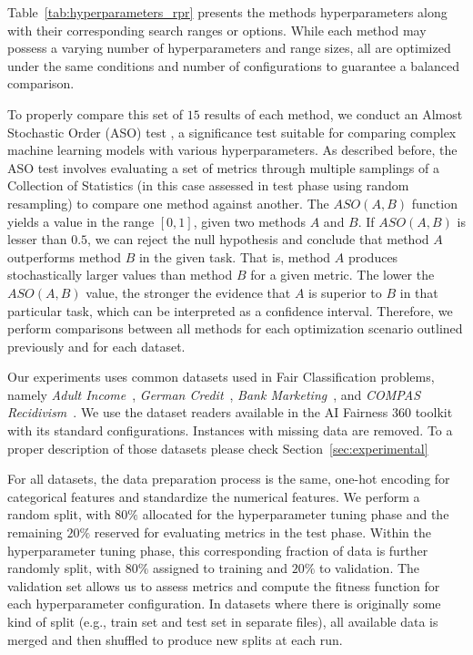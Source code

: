 Table~\ref{tab:hyperparameters_rpr} presents the methods hyperparameters along with their corresponding search ranges or options. While each method may possess a varying number of hyperparameters and range sizes, all are optimized under the same conditions and number of configurations to guarantee a balanced comparison.

To properly compare this set of $15$ results of each method, we conduct an Almost Stochastic Order (ASO) test \citep{dror2019deep}, a significance test suitable for comparing complex machine learning models with various hyperparameters. As described before, the ASO test involves evaluating a set of metrics through multiple samplings of a Collection of Statistics (in this case assessed in test phase using random resampling) to compare one method against another. The $ASO(A, B)$ function yields a value in the range $[0, 1]$, given two methods $A$ and $B$. If $ASO(A, B)$ is lesser than $0.5$, we can reject the null hypothesis and conclude that method $A$ outperforms method $B$ in the given task. That is, method $A$ produces stochastically larger values than method $B$ for a given metric. The lower the $ASO(A, B)$ value, the stronger the evidence that $A$ is superior to $B$ in that particular task, which can be interpreted as a confidence interval. Therefore, we perform comparisons between all methods for each optimization scenario outlined previously and for each dataset.

Our experiments uses common datasets used in Fair Classification problems, namely \textit{Adult Income}~\citep{misc_adult_2}, \textit{German Credit}~\citep{misc_statlog_(german_credit_data)_144}, \textit{Bank Marketing}~\citep{misc_bank_marketing_222}, and \textit{COMPAS Recidivism}~\citep{misc_COMPAS}. We use the dataset readers available in the AI Fairness 360 toolkit~\citep{aif360-oct-2018} with its standard configurations. Instances with missing data are removed. To a proper description of those datasets please check Section~\ref{sec:experimental}

For all datasets, the data preparation process is the same, one-hot encoding for categorical features and standardize the numerical features. We perform a random split, with $80\%$ allocated for the hyperparameter tuning phase and the remaining $20\%$ reserved for evaluating metrics in the test phase. Within the hyperparameter tuning phase, this corresponding fraction of data is further randomly split, with $80\%$ assigned to training and $20\%$ to validation. The validation set allows us to assess metrics and compute the fitness function for each hyperparameter configuration. In datasets where there is originally some kind of split (e.g., train set and test set in separate files), all available data is merged and then shuffled to produce new splits at each run.

